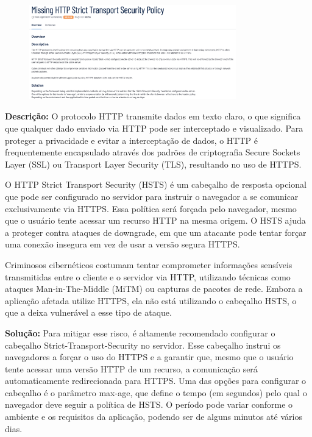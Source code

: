 \documentclass[a4paper,12pt]{article}
\begin{document}
\begin{enumerate}
                        \begin{figure}[h!]
                        \centering
                        \includegraphics[width=0.8\textwidth]{assets/images-was/Vulnerabilidades Relacionadas a Configurações de Segurança HTTP E TLS/Missing HTTP Strict Transport Security Policy.png}
                        \end{figure}
                        \FloatBarrier
                        \textbf{Descrição:} O protocolo HTTP transmite dados em texto claro, o que significa que qualquer dado enviado via HTTP pode ser interceptado e visualizado. Para proteger a privacidade e evitar a interceptação de dados, o HTTP é frequentemente encapsulado através dos padrões de criptografia Secure Sockets Layer (SSL) ou Transport Layer Security (TLS), resultando no uso de HTTPS.

O HTTP Strict Transport Security (HSTS) é um cabeçalho de resposta opcional que pode ser configurado no servidor para instruir o navegador a se comunicar exclusivamente via HTTPS. Essa política será forçada pelo navegador, mesmo que o usuário tente acessar um recurso HTTP na mesma origem. O HSTS ajuda a proteger contra ataques de downgrade, em que um atacante pode tentar forçar uma conexão insegura em vez de usar a versão segura HTTPS.

Criminosos cibernéticos costumam tentar comprometer informações sensíveis transmitidas entre o cliente e o servidor via HTTP, utilizando técnicas como ataques Man-in-The-Middle (MiTM) ou capturas de pacotes de rede. Embora a aplicação afetada utilize HTTPS, ela não está utilizando o cabeçalho HSTS, o que a deixa vulnerável a esse tipo de ataque.

\textbf{Solução:} Para mitigar esse risco, é altamente recomendado configurar o cabeçalho Strict-Transport-Security no servidor. Esse cabeçalho instrui os navegadores a forçar o uso do HTTPS e a garantir que, mesmo que o usuário tente acessar uma versão HTTP de um recurso, a comunicação será automaticamente redirecionada para HTTPS. Uma das opções para configurar o cabeçalho é o parâmetro max-age, que define o tempo (em segundos) pelo qual o navegador deve seguir a política de HSTS. O período pode variar conforme o ambiente e os requisitos da aplicação, podendo ser de alguns minutos até vários dias.


\end{enumerate}
\end{document}
